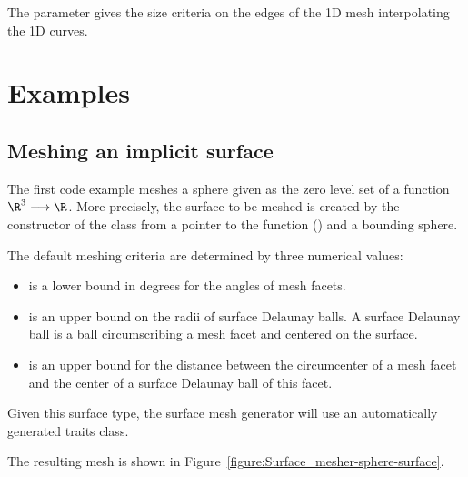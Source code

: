 The parameter  gives the size criteria on the edges of
the 1D mesh interpolating the 1D curves.

\def\ccLongParamLayout{\ccFalse}

\section{Examples}
\label{SurfaceMesher_section_example}

\subsection{Meshing an implicit surface}
The first code example meshes a sphere 
given as the zero level set of a function $\R^3 \longrightarrow \R$.
More precisely, 
the surface to be meshed is created 
by the constructor
of the class 
from a pointer to the function ()
and a bounding sphere.

The default meshing criteria are determined  by three numerical
values: 
\begin{itemize}
\item {} is a lower bound in degrees for the angles 
     of mesh facets.
\item {} is an upper bound on the radii of surface Delaunay
balls. A surface Delaunay ball is a ball circumscribing a mesh facet
and centered on the surface. 
\item {} is an upper bound for the distance 
between the circumcenter of a mesh facet and the center of a surface
Delaunay ball of this facet.
\end{itemize}

Given this surface type, the surface mesh generator will use
an automatically generated traits class.

The resulting mesh is shown in 
Figure~\ref{figure:Surface_mesher-sphere-surface}.

